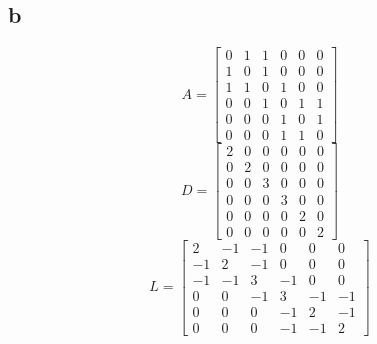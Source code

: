 \documentclass{article}
\begin{document}
\subsection{b}
\begin{equation*}
  A = \begin{bmatrix}
      0 & 1 & 1 & 0 & 0 & 0 \\
      1 & 0 & 1 & 0 & 0 & 0 \\
      1 & 1 & 0 & 1 & 0 & 0 \\
      0 & 0 & 1 & 0 & 1 & 1 \\
      0 & 0 & 0 & 1 & 0 & 1 \\
      0 & 0 & 0 & 1 & 1 & 0
    \end{bmatrix}
\end{equation*}
\begin{equation*}
  D = \begin{bmatrix}
      2 & 0 & 0 & 0 & 0 & 0 \\
      0 & 2 & 0 & 0 & 0 & 0 \\
      0 & 0 & 3 & 0 & 0 & 0 \\
      0 & 0 & 0 & 3 & 0 & 0 \\
      0 & 0 & 0 & 0 & 2 & 0 \\
      0 & 0 & 0 & 0 & 0 & 2
    \end{bmatrix}
\end{equation*}
\begin{equation*}
  L = \begin{bmatrix}
      2  & -1 & -1 & 0  & 0  & 0 \\
      -1 & 2  & -1 & 0  & 0  & 0 \\
      -1 & -1 & 3  & -1 & 0  & 0 \\
      0  & 0  & -1 & 3  & -1 & -1 \\
      0  & 0  & 0  & -1 & 2  & -1 \\
      0  & 0  & 0  & -1 & -1 & 2
    \end{bmatrix}
\end{equation*}
\end{document}
